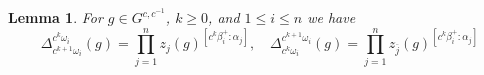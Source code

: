 \documentclass[12pt]{amsart}
\newcommand{\saySS}[1]{\say[SS]{\color{blue}{\bf SS:}\;#1}}
\newcommand{\ol}[1]{\overline{#1}}
\newtheorem{lemma}[theorem]{Lemma}
\theoremstyle{remark}
\numberwithin{equation}{section}
\numberwithin{figure}{section}
\begin{document}

\begin{lemma}
  \label{lemma:coefficient_identity_powers}
For $g \in G^{c,c^{-1}}$, $k \geq 0$, and $1 \leq i \leq n$ we have
\begin{equation*}
    \Delta_{c^{k+1} \omega_i}^{c^k \omega_i}(g)
    =
    \prod_{j=1}^nz_j(g)^{[c^k\beta_i^+:\alpha_j]},\quad 
    \Delta_{c^k \omega_i}^{c^{k+1} \omega_i}(g)
    =
    \prod_{j=1}^nz_{\ol{j}}(g)^{[c^k\beta_i^+:\alpha_j]}
\end{equation*}

\end{lemma}
\end{document}
